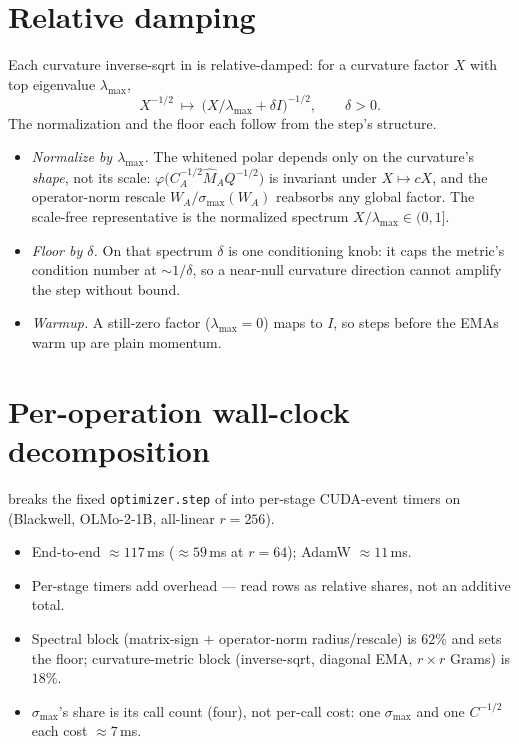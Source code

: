 \documentclass[11pt]{article}
\newcommand{\smax}{\sigma_{\max}}
\newcommand{\polar}{\varphi}                 %
\theoremstyle{plain}
\theoremstyle{definition}
\theoremstyle{remark}
\begin{document}
\section{Relative damping}
\label{app:damping}
Each curvature inverse-sqrt in  is relative-damped: for a curvature factor $X$ with top eigenvalue $\lambda_{\max}$,
\begin{equation*}
  X^{-1/2}\ \longmapsto\ \big(X/\lambda_{\max}+\delta I\big)^{-1/2},\qquad \delta>0 .
\end{equation*}
The normalization and the floor each follow from the step's structure.
\begin{itemize}[leftmargin=1.5em,itemsep=2pt,topsep=2pt]
  \item \emph{Normalize by $\lambda_{\max}$.} The whitened polar depends only on the curvature's \emph{shape}, not its scale: $\polar\!\big(C_A^{-1/2}\hat M_A Q^{-1/2}\big)$ is invariant under $X\mapsto cX$, and the operator-norm rescale $W_A/\smax(W_A)$ reabsorbs any global factor. The scale-free representative is the normalized spectrum $X/\lambda_{\max}\in(0,1]$.
  \item \emph{Floor by $\delta$.} On that spectrum $\delta$ is one conditioning knob: it caps the metric's condition number at ${\sim}1/\delta$, so a near-null curvature direction cannot amplify the step without bound.
  \item \emph{Warmup.} A still-zero factor ($\lambda_{\max}=0$) maps to $I$, so steps before the EMAs warm up are plain momentum.
\end{itemize}

\section{Per-operation wall-clock decomposition}
\label{app:walltime}
 breaks the fixed \texttt{optimizer.step} of
 into per-stage CUDA-event timers on 
(Blackwell, OLMo-2-1B, all-linear $r{=}256$).
\begin{itemize}[leftmargin=1.5em,itemsep=1pt,topsep=2pt]
  \item End-to-end $\approx117$\,ms ($\approx59$\,ms at $r{=}64$); AdamW $\approx11$\,ms.
  \item Per-stage timers add overhead --- read rows as relative shares, not an additive total.
  \item Spectral block (matrix-sign $+$ operator-norm radius/rescale) is $62\%$ and sets the floor; curvature-metric block (inverse-sqrt, diagonal EMA, $r{\times}r$ Grams) is $18\%$.
  \item $\smax$'s share is its call count (four), not per-call cost: one $\smax$ and one $C^{-1/2}$ each cost $\approx7$\,ms.
\end{itemize}
\end{document}
